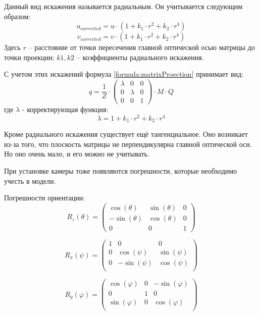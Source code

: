 Данный вид искажения называется радиальным. Он учитывается следующим образом:
$$
u_{corrected} = u \cdot (1 + k_1 \cdot r^2  + k_2 \cdot r^4 )
$$
$$
v_{corrected} = v \cdot (1 + k_1 \cdot r^2  + k_2 \cdot r^4 )
$$
Здесь $r$ – расстояние от точки пересечения главной оптической осью матрицы до точки проекции; $k1, k2$ – коэффициенты радиального искажения.

С учетом этих искажений формула \ref{formula:matrixProection} принимает вид:
\begin{equation}
\label{formula:matrixProection2}
q = \frac{1}{Z} \cdot \left( 
\begin{array}{ccc}
	\lambda & 0 & 0 \\ 
	0 & \lambda & 0 \\ 
	0 & 0 & 1
\end{array} 
\right) 
 \cdot M \cdot Q
\end{equation}
где $\lambda$ - корректирующая функция:
$$ \lambda = 1 + k_1 \cdot r^2  + k_2 \cdot r^4 $$

Кроме радиального искажения существует ещё тангенциальное. Оно возникает из-за того, что плоскость матрицы не перпендикулярна главной оптической оси. Но оно очень мало, и его можно не учитывать. 

При установке камеры тоже появляются погрешности, которые необходимо учесть в модели.

Погрешности ориентации:
$$R_z(\theta) = 
\left( 
	\begin{array}{ccc}
	\cos (\theta ) & \sin (\theta ) & 0 \\ 
	- \sin (\theta ) & \cos (\theta ) & 0 \\ 
	0 & 0 & 1
\end{array} 
\right) 
$$

$$
R_x(\psi ) = 
\left( 
	\begin{array}{ccc}
	1  & 0 & 0 \\ 
	0 & \cos (\psi ) & \sin (\psi ) \\ 
	0 & - \sin (\psi ) & \cos (\psi ) \\ 
\end{array} 
\right) 
$$

$$
R_y(\varphi ) = 
\left( 
	\begin{array}{ccc}
	\cos (\varphi ) & 0 & - \sin ( \varphi )  \\ 
	0 & 1 & 0 \\ 
	\sin (\varphi ) & 0 & \cos (\varphi ) \\ 
\end{array} 
\right) 
$$

